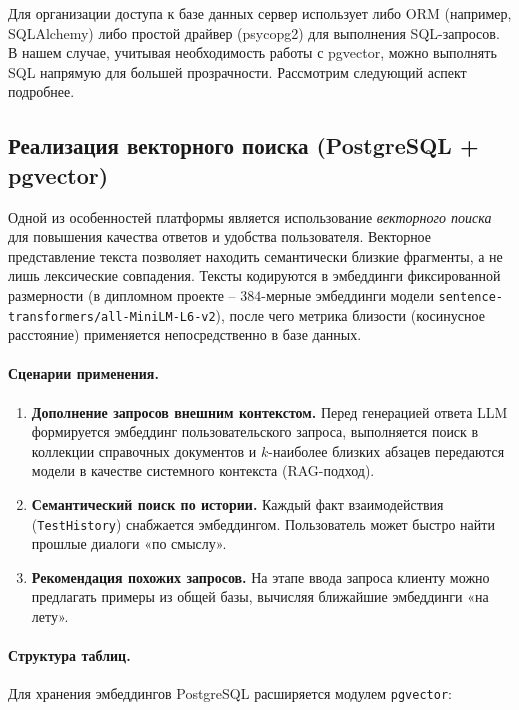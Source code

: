 Для организации доступа к базе данных сервер использует либо ORM (например, SQLAlchemy) либо простой драйвер (psycopg2) для выполнения SQL-запросов. В нашем случае, учитывая необходимость работы с pgvector, можно выполнять SQL напрямую для большей прозрачности. Рассмотрим следующий аспект подробнее.

\subsection{Реализация векторного поиска (PostgreSQL + pgvector)}

Одной из особенностей платформы является использование \emph{векторного поиска}
для повышения качества ответов и удобства пользователя.
Векторное представление текста позволяет находить семантически близкие фрагменты,
а не лишь лексические совпадения.  
Тексты кодируются в эмбеддинги фиксированной размерности
(в дипломном проекте – $384$-мерные эмбеддинги  
модели \verb|sentence-transformers/all-MiniLM-L6-v2|),
после чего метрика близости (косинусное расстояние) применяется непосредственно в базе данных\cite{wiki:cosine_similarity}.

\paragraph{Сценарии применения.}
\begin{enumerate}[label=\arabic*]
  \item \textbf{Дополнение запросов внешним контекстом.}  
        Перед генерацией ответа LLM формируется эмбеддинг пользовательского запроса,
        выполняется поиск в коллекции справочных документов
        и $k$-наиболее близких абзацев передаются модели в качестве
        системного контекста (RAG-подход).
  \item \textbf{Семантический поиск по истории.}  
        Каждый факт взаимодействия (\texttt{TestHistory}) снабжается эмбеддингом.
        Пользователь может быстро найти прошлые диалоги «по смыслу».
  \item \textbf{Рекомендация похожих запросов.}  
        На этапе ввода запроса клиенту можно предлагать примеры из общей базы, вычисляя ближайшие эмбеддинги «на лету»\cite{flowgpt:community}.
\end{enumerate}

\paragraph{Структура таблиц.}
Для хранения эмбеддингов PostgreSQL расширяется модулем \texttt{pgvector}:


